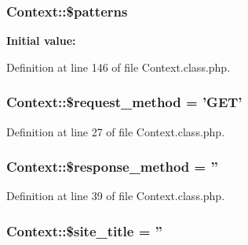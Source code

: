 \hypertarget{classContext_a257fa15929338411949a173ff34ab35d}{
\subsubsection[{\$patterns}]{\setlength{\rightskip}{0pt plus 5cm}Context\+::\$patterns}}\label{classContext_a257fa15929338411949a173ff34ab35d}
{\bfseries Initial value\+:}


Definition at line 146 of file Context.\+class.\+php.

\hypertarget{classContext_a1e80f487f65708456eb17be0024aee50}{
\subsubsection[{\$request\+\_\+method}]{\setlength{\rightskip}{0pt plus 5cm}Context\+::\$request\+\_\+method = 'G\+E\+T'}}\label{classContext_a1e80f487f65708456eb17be0024aee50}


Definition at line 27 of file Context.\+class.\+php.

\hypertarget{classContext_a383836fb81ee24d673c7145e4d2eb030}{
\subsubsection[{\$response\+\_\+method}]{\setlength{\rightskip}{0pt plus 5cm}Context\+::\$response\+\_\+method = ''}}\label{classContext_a383836fb81ee24d673c7145e4d2eb030}


Definition at line 39 of file Context.\+class.\+php.

\hypertarget{classContext_a3663ad0bbcb194dbb5766db96c9ecefb}{
\subsubsection[{\$site\+\_\+title}]{\setlength{\rightskip}{0pt plus 5cm}Context\+::\$site\+\_\+title = ''}}\label{classContext_a3663ad0bbcb194dbb5766db96c9ecefb}



